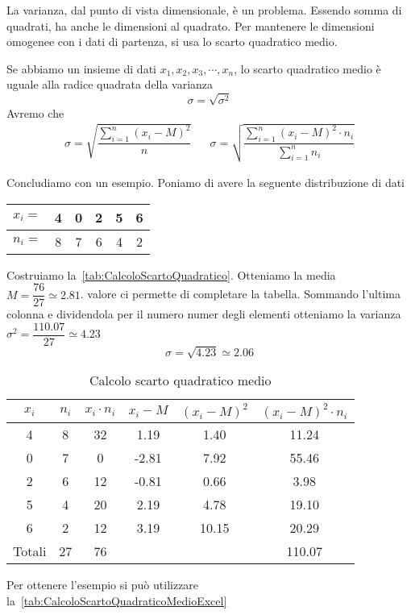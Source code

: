 La varianza,  dal punto di vista dimensionale, è un problema.  Essendo somma di quadrati, ha anche le dimensioni al quadrato. Per mantenere le dimensioni omogenee con i dati  di partenza, si usa lo scarto quadratico medio. 
\begin{defn}
	Se abbiamo un insieme di dati $x_{1},x_{2},x_{3},\cdots,x_{n}$, lo scarto quadratico medio è  uguale alla radice quadrata della varianza \[\sigma=\sqrt{\sigma^2} \]
	Avremo che 
	\begin{align*}
		\sigma=\sqrt{\dfrac{\sum_{i=1}^{n}(x_{i}-M)^2}{n}}&&\sigma=\sqrt{\dfrac{\sum_{i=1}^{n}(x_{i}-M)^{2}\cdot n_{i}}{\sum_{i=1}^{n} n_{i}}}
	\end{align*}
\end{defn}
Concludiamo con un esempio. Poniamo di avere la seguente distribuzione di dati
\begin{center}
	\begin{tabular}{l*{5} {S[table-format=1.0]}}
		{$x_{i}=$}	&4  &0  &2  &5  &6\\
		\midrule 
		{$n_{i}=$}	&8 &7  &6 &4 &2\\   
	\end{tabular}
\end{center}
Costruiamo la~\vref{tab:CalcoloScartoQuadratico}. Otteniamo la media  $M=\dfrac{76}{27}\simeq\num{2.81}$.  valore ci permette di completare la tabella. Sommando l'ultima colonna e dividendola per il  numero numer degli elementi otteniamo la varianza $\sigma^2=\dfrac{110.07}{27}\simeq\num{4.23}$
\[\sigma=\sqrt{4.23}\simeq\num{2.06}\]
\begin{table}
	\centering
	\begin{tabular}{S[table-format=1.0]S[table-format=2.0]S[table-format=2.0]S[table-format=1.2]S[table-format=1.4]S[table-format=2.4] }
		\toprule
		{$x_i$}	&{$n_i$}  & {$x_i\cdot n_i$} & {$x_i-M$} & {$(x_i-M )^2$} & {$(x_i-M)^2\cdot n_i $ } \\
			& 8 & 32  & 1.19 &1.40  & 11.24 \\ 
		0	& 7 & 0 & -2.81 &7.92  & 55.46 \\ 
		2	& 6 & 12 & -0.81 &0.66  & 3.98 \\ 
		5	& 4 & 20& 2.19&4.78   & 19.10 \\ 
		6	& 2 & 12 & 3.19 &10.15  &20.29 \\
		\midrule 
		{Totali}& 27& 76 &  &  & 110.07 \\
		\bottomrule 
	\end{tabular} 
	\caption{Calcolo scarto quadratico medio}
	\label{tab:CalcoloScartoQuadratico}
\end{table}
Per ottenere l'esempio si può utilizzare la~\vref{tab:CalcoloScartoQuadraticoMedioExcel}